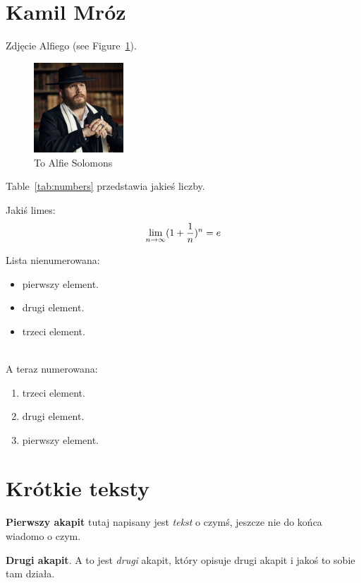 \section{Kamil Mróz}
\label{sec:Kamil}

Zdjęcie Alfiego (see Figure~\ref{fig:alfie}).

\begin{figure}[htbp]
    \centering
    \includegraphics[width=0.3\textwidth]{pictures/Kamil.jpg}
    \caption{To Alfie Solomons}
    \label{fig:alfie}
\end{figure}

Table~\ref{tab:numbers} przedstawia jakieś liczby. %



Jakiś limes: \[\lim_{n\to\infty} (1+ {1\over\displaystyle n})^n = e\]

Lista nienumerowana:
\begin{itemize}
  \item pierwszy element.
  \item drugi element.
  \item trzeci element.
\end{itemize} \\

A teraz numerowana:
\begin{enumerate}
  \item trzeci element.
  \item drugi element.
  \item pierwszy element.
\end{enumerate}

\setlength{\parindent}{20pt}

\section*{Krótkie teksty}
\textbf{Pierwszy akapit} tutaj napisany jest \textit{tekst} o czymś, jeszcze nie do końca wiadomo o czym.

\textbf{Drugi akapit}. A to jest \textit{drugi} akapit, który opisuje drugi akapit i jakoś to sobie tam działa. 